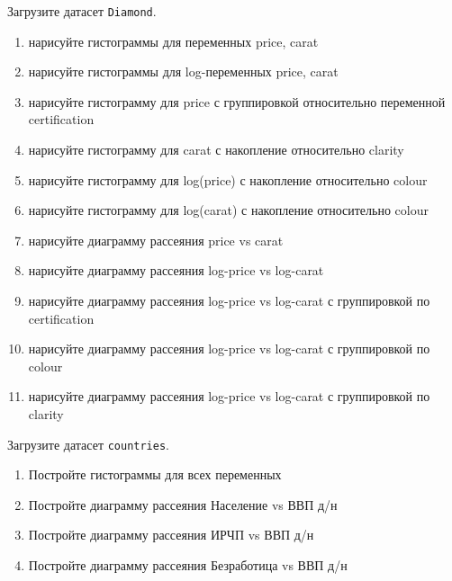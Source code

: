 \begin{exercise}
Загрузите датасет \texttt{Diamond}.
\begin{enumerate}
	\item нарисуйте гистограммы для переменных price, carat
	\item нарисуйте гистограммы для log-переменных price, carat
	\item нарисуйте гистограмму для price с группировкой относительно переменной certification
	\item нарисуйте гистограмму для carat с накопление относительно clarity 
	\item нарисуйте гистограмму для log(price) с накопление  относительно colour
	\item нарисуйте гистограмму для log(carat) с накопление относительно colour
	\item нарисуйте диаграмму рассеяния price vs carat
	\item нарисуйте диаграмму рассеяния log-price vs log-carat
	\item нарисуйте диаграмму рассеяния log-price vs log-carat с группировкой по certification
	\item нарисуйте диаграмму рассеяния log-price vs log-carat с группировкой по colour
	\item нарисуйте диаграмму рассеяния log-price vs log-carat с группировкой по clarity
\end{enumerate}
\end{exercise}

\begin{exercise}
Загрузите датасет \texttt{countries}.
\begin{enumerate}
	\item Постройте гистограммы для всех переменных
	\item Постройте диаграмму рассеяния Население vs ВВП д/н
	\item Постройте диаграмму рассеяния ИРЧП vs ВВП д/н
	\item Постройте диаграмму рассеяния Безработица vs ВВП д/н
\end{enumerate}
\end{exercise}